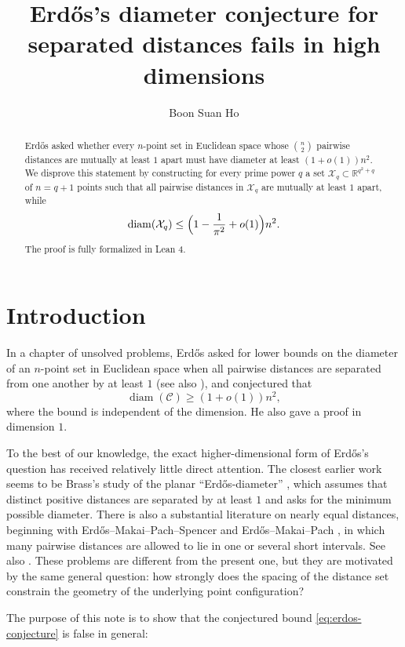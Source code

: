 \documentclass[twoside, reqno, 12pt]{amsart}
\title[Erd\H{o}s's diameter conjecture for separated distances fails in high dimensions]%
{Erd\H{o}s's diameter conjecture for separated distances fails in high dimensions}
\author{Boon Suan Ho}
\date{}
\theoremstyle{definition}
\theoremstyle{remark}
\DeclareMathOperator{\diam}{diam}
\begin{document}
\begin{abstract}
Erd\H{o}s asked whether every $n$-point set in Euclidean space whose
$\binom{n}{2}$ pairwise distances are mutually at least $1$ apart must have
diameter at least $(1+o(1))n^2$. We disprove this statement by constructing 
for every prime power $q$ a set
$\mathcal X_q\subset \mathbb R^{q^2+q}$ of $n=q+1$ points such that all
pairwise distances in $\mathcal X_q$ are mutually at least $1$ apart, while
\[
\diam(\mathcal X_q)
\le \Bigl(1-\frac{1}{\pi^2}+o(1)\Bigr)n^2.
\]
The proof is fully formalized in Lean 4.
\end{abstract}
\maketitle
\section{Introduction}
In a chapter of unsolved problems, Erd\H{o}s asked for lower bounds on the
diameter of an $n$-point set in Euclidean space when all pairwise distances are
separated from one another by at least $1$ \cite[Problem 20]{Erdos1997} 
(see also \cite[Problem 670]{Bloom}), and conjectured that
\begin{equation}\label{eq:erdos-conjecture}
\diam(\mathcal C) \ge (1+o(1))n^2,
\end{equation}
where the bound is independent of the dimension. He also gave a proof
in dimension $1$.

To the best of our knowledge, the exact higher-dimensional form of
Erd\H{o}s's question has received relatively little direct attention. The
closest earlier work seems to be Brass's study of the planar
``Erd\H{o}s-diameter'' \cite{Brass1996}, which assumes that distinct positive
distances are separated by at least $1$ and asks for the minimum possible
diameter. There is also a substantial literature on nearly equal distances,
beginning with Erd\H{o}s--Makai--Pach--Spencer \cite{EMPS1991} and
Erd\H{o}s--Makai--Pach \cite{EMP1993}, in which many pairwise distances are
allowed to lie in one or several short intervals. See also 
\cite{FranklKupavskii2023, PRV2006}. These problems are different
from the present one, but they are motivated by the same general question:
how strongly does the spacing of the distance set constrain the geometry of the
underlying point configuration?

The purpose of this note is to show that the conjectured bound
\eqref{eq:erdos-conjecture} is false in general:
\end{document}
